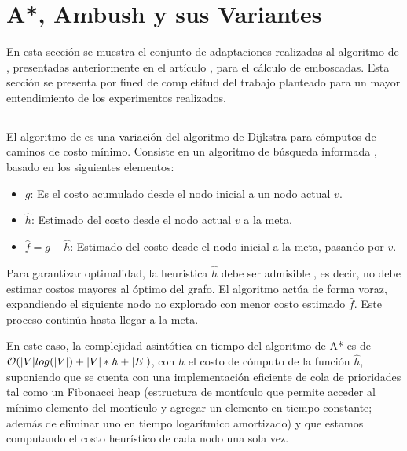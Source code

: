 \section{A*, A\*mbush y sus Variantes}
\label{sec:ambush}

En esta secci\'on se muestra el conjunto de adaptaciones realizadas
al algoritmo de \astar, presentadas anteriormente en el art\'iculo
\cite{FGC12e}, para el c\'alculo de emboscadas. Esta secci\'on se
presenta por fined de completitud del trabajo planteado para un
mayor entendimiento de los experimentos realizados.

\subsection{\astar}

El algoritmo de \astar \cite{HNR72}\cite{RN93}\cite{MF09}
es una variación del algoritmo de Dijkstra \cite{CLRS09}
para cómputos de caminos de costo mínimo.
Consiste en un algoritmo de búsqueda informada \cite{RN93},
basado en los siguientes elementos:

\begin{itemize}
\item $g$: Es el costo acumulado desde el nodo inicial a un nodo actual $v$.
\item $\hat{h}$: Estimado del costo desde el nodo actual $v$ a la meta.
\item $\hat{f} = g + \hat{h}$: Estimado del costo desde el nodo inicial a la meta, pasando por $v$.
\end{itemize}

Para garantizar optimalidad, la heuristica $\hat{h}$ debe
ser admisible \cite{HNR72}, es decir, no debe estimar
costos mayores al óptimo del grafo.
El algoritmo actúa de forma voraz, expandiendo el 
si\-guien\-te nodo no explorado con menor costo estimado $\hat{f}$.
Este proceso continúa hasta llegar a la meta. 

En este caso, la complejidad asintótica en tiempo
del algoritmo de A* es de $\mathcal{O}(|V|log(|V|) + |V|*h + |E|)$,
con $h$ el costo de cómputo de la función $\hat{h}$,
suponiendo que se cuenta con una implementación eficiente de
cola de prioridades tal como un Fibonacci heap \cite{CLRS09} (estructura
de montículo que permite acceder al mínimo elemento del montículo
y agregar un elemento en tiempo constante; además de
e\-li\-mi\-nar uno en tiempo logarítmico amortizado) y que estamos
computando el costo heurístico de cada nodo una sola vez.

\subsection{\ambush}

